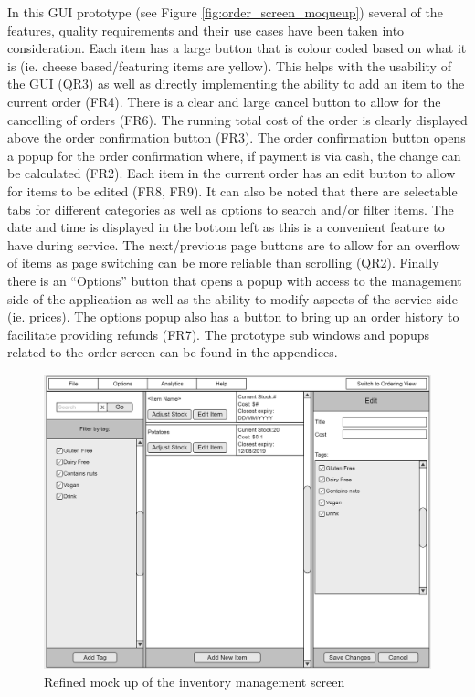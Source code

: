 In this GUI prototype (see Figure \ref{fig:order_screen_moqueup}) several of the features, quality requirements and their use cases have been taken into consideration. Each item has a large button that is colour coded based on what it is (ie. cheese based/featuring items are yellow). This helps with the usability of the GUI (QR3) as well as directly implementing the ability to add an item to the current order (FR4). There is a clear and large cancel button to allow for the cancelling of orders (FR6). The running total cost of the order is clearly displayed above the order confirmation button (FR3). The order confirmation button opens a popup for the order confirmation where, if payment is via cash, the change can be calculated (FR2). Each item in the current order has an edit button to allow for items to be edited (FR8, FR9). It can also be noted that there are selectable tabs for different categories as well as options to search and/or filter items. The date and time is displayed in the bottom left as this is a convenient feature to have during service. The next/previous page buttons are to allow for an overflow of items as page switching can be more reliable than scrolling (QR2). Finally there is an “Options” button that opens a popup with access to the management side of the application as well as the ability to modify aspects of the service side (ie. prices). The options popup also has a button to bring up an order history to facilitate providing refunds (FR7).
The prototype sub windows and popups related to the order screen can be found in the appendices.

\pagebreak

\begin{figure}[H]
	\centering
	\includegraphics[width=150mm]{images/GUI_prototypes/Inventory_screen.png}
	\caption{Refined mock up of the inventory management screen}
	\label{fig:management_screen_moqueup}
\end{figure}

